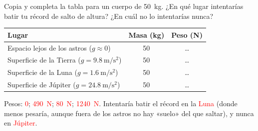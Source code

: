 \begin{exercise}
    Copia y completa la tabla para un cuerpo de \qty{50}{\kg}. ¿En qué lugar intentarías batir tu récord de salto de altura? ¿En cuál no lo intentarías nunca?
    \begin{center}
        \begin{tabular}{@{}lcc@{}}
            \toprule
            \textbf{Lugar} & \textbf{Masa (\unit{\kg})} & \textbf{Peso (\unit{\newton})} \\
            \midrule
            Espacio lejos de los astros (\(g \approx 0\)) & 50 & \ldots \\[3pt]
            Superficie de la Tierra (\(g = \qty{9.8}{\m\per\square\s}\)) & 50 & \ldots \\[3pt]
            Superficie de la Luna (\(g = \qty{1.6}{\m\per\square\s}\)) & 50 & \ldots \\[3pt]
            Superficie de Júpiter (\(g = \qty{24.8}{\m\per\square\s}\)) & 50 & \ldots \\
            \bottomrule
        \end{tabular}
    \end{center}
    \begin{solu}
        Pesos: \textcolor{red}{0}; \textcolor{red}{\qty{490}{\newton}}; \textcolor{red}{\qty{80}{\newton}}; \textcolor{red}{\qty{1240}{\newton}}. Intentaría batir el récord en la \textcolor{red}{Luna} (donde menos pesaría, aunque fuera de los astros no hay «suelo» del que saltar), y nunca en \textcolor{red}{Júpiter}.
    \end{solu}
\end{exercise}

